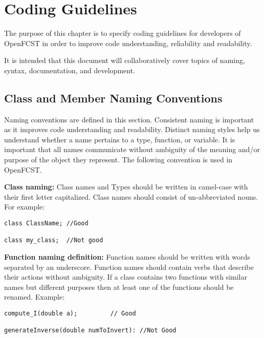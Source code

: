 \chapter{Coding Guidelines}

The purpose of this chapter is to specify coding guidelines for developers of OpenFCST in order to improve code understanding, reliability and readability.

It is intended that this document will collaboratively cover topics of naming, syntax, documentation, and development.

\section{Class and Member Naming Conventions}

Naming conventions are defined in this section. Consistent naming is important as it improves code understanding and readability. Distinct naming styles help us understand whether a name pertains to a type, function, or variable. It is important that all names communicate without ambiguity of the meaning and/or purpose of the object they represent. The following convention is used in OpenFCST.
  
\textbf{Class naming:} Class names and Types should be written in camel-case with their first letter capitalized. Class names should consist of un-abbreviated nouns. For example:
\begin{lstlisting}
class ClassName; //Good

class my_class;  //Not good
\end{lstlisting}

\textbf{Function naming definition:} Function names should be written with words separated by an underscore. Function names should contain verbs that describe their actions without ambiguity. If a class contains two functions with similar names but different purposes then at least one of the functions should be renamed. Example:

\begin{lstlisting}
compute_I(double a); 		 // Good

generateInverse(double numToInvert): //Not Good
\end{lstlisting}

